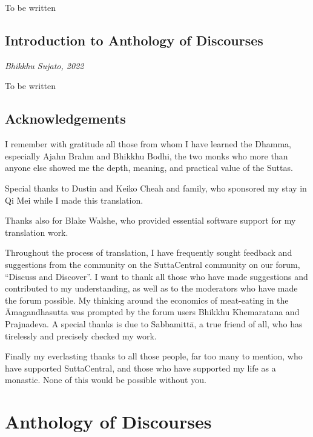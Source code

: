 \documentclass[12pt,openany]{book}%
\let\oldcontentsline\contentsline
\newcommand{\nopagecontentsline}[3]{\oldcontentsline{#1}{#2}{}}
\newcommand*{\scbyline}[1]{\begin{flushright}\textit{#1}\end{flushright}\bigskip}
\let\oldmainmatter\mainmatter
\renewcommand{\mainmatter}{%
\chapterfont{\setstretch{.85}\normalfont\centering}%
\sectionfont{\setstretch{.85}\normalfont\centering}%
\oldmainmatter}
\begin{document}
To be written

%
\chapter*{Introduction to Anthology of Discourses}

\scbyline{Bhikkhu Sujato, 2022}

To be written

%
\chapter*{Acknowledgements}

I remember with gratitude all those from whom I have learned the Dhamma, especially Ajahn Brahm and Bhikkhu Bodhi, the two monks who more than anyone else showed me the depth, meaning, and practical value of the Suttas.

Special thanks to Dustin and Keiko Cheah and family, who sponsored my stay in Qi Mei while I made this translation.

Thanks also for Blake Walshe, who provided essential software support for my translation work.

Throughout the process of translation, I have frequently sought feedback and suggestions from the community on the SuttaCentral community on our forum, “Discuss and Discover”. I want to thank all those who have made suggestions and contributed to my understanding, as well as to the moderators who have made the forum possible. My thinking around the economics of meat-eating in the Āmagandhasutta was prompted by the forum users Bhikkhu Khemaratana and Prajnadeva. A special thanks is due to \textsanskrit{Sabbamittā}, a true friend of all, who has tirelessly and precisely checked my work. 

Finally my everlasting thanks to all those people, far too many to mention, who have supported SuttaCentral, and those who have supported my life as a monastic. None of this would be possible without you.

%
\mainmatter%
\pagestyle{fancy}%
\part*{Anthology of Discourses}
\markboth{}{}
\addtocontents{toc}{\let\protect\contentsline\protect\oldcontentsline}
\end{document}
